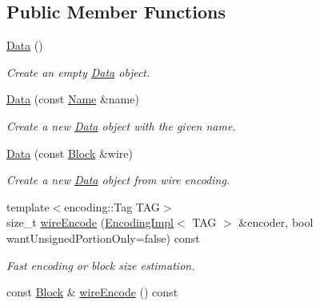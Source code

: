 \subsection*{Public Member Functions}
\begin{DoxyCompactItemize}
\item 
\hyperlink{classndn_1_1Data_a06d8fcf5fc51f5f4f359cd6e916d482e}{Data} ()
\begin{DoxyCompactList}\small\item\em Create an empty \hyperlink{classndn_1_1Data}{Data} object. \end{DoxyCompactList}\item 
\hyperlink{classndn_1_1Data_a8be555bb394287124a28994eee30a97b}{Data} (const \hyperlink{classndn_1_1Name}{Name} \&name)
\begin{DoxyCompactList}\small\item\em Create a new \hyperlink{classndn_1_1Data}{Data} object with the given name. \end{DoxyCompactList}\item 
\hyperlink{classndn_1_1Data_aee8f3047944fe41717be656e6b2ff76e}{Data} (const \hyperlink{classndn_1_1Block}{Block} \&wire)
\begin{DoxyCompactList}\small\item\em Create a new \hyperlink{classndn_1_1Data}{Data} object from wire encoding. \end{DoxyCompactList}\item 
{\footnotesize template$<$encoding\+::\+Tag T\+AG$>$ }\\size\+\_\+t \hyperlink{classndn_1_1Data_a2a65cdabf6fe41d895b7109bdaaf8bf8}{wire\+Encode} (\hyperlink{classndn_1_1encoding_1_1EncodingImpl}{Encoding\+Impl}$<$ T\+AG $>$ \&encoder, bool want\+Unsigned\+Portion\+Only=false) const
\begin{DoxyCompactList}\small\item\em Fast encoding or block size estimation. \end{DoxyCompactList}\item 
const \hyperlink{classndn_1_1Block}{Block} \& \hyperlink{classndn_1_1Data_a59991bec77f7f2a161c049f6efcf79df}{wire\+Encode} () const\hypertarget{classndn_1_1Data_a59991bec77f7f2a161c049f6efcf79df}{}\label{classndn_1_1Data_a59991bec77f7f2a161c049f6efcf79df}


\end{DoxyCompactItemize}
